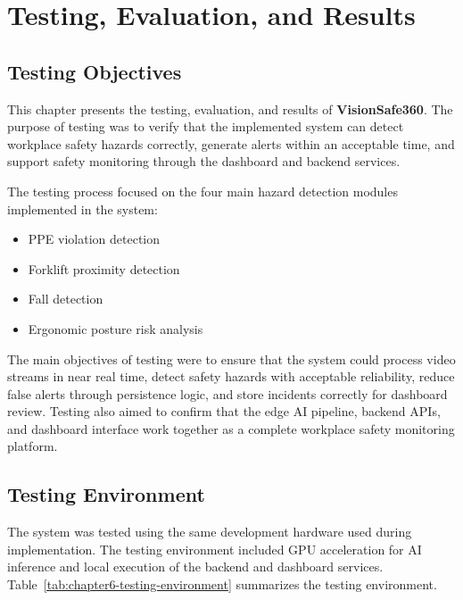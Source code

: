 \chapter{Testing, Evaluation, and Results}

\section{Testing Objectives}

This chapter presents the testing, evaluation, and results of \textbf{VisionSafe360}. The purpose of testing was to verify that the implemented system can detect workplace safety hazards correctly, generate alerts within an acceptable time, and support safety monitoring through the dashboard and backend services.

The testing process focused on the four main hazard detection modules implemented in the system:

\begin{itemize}
\item PPE violation detection
\item Forklift proximity detection
\item Fall detection
\item Ergonomic posture risk analysis
\end{itemize}

The main objectives of testing were to ensure that the system could process video streams in near real time, detect safety hazards with acceptable reliability, reduce false alerts through persistence logic, and store incidents correctly for dashboard review. Testing also aimed to confirm that the edge AI pipeline, backend APIs, and dashboard interface work together as a complete workplace safety monitoring platform.

\section{Testing Environment}

The system was tested using the same development hardware used during implementation. The testing environment included GPU acceleration for AI inference and local execution of the backend and dashboard services. Table~\ref{tab:chapter6-testing-environment} summarizes the testing environment.

